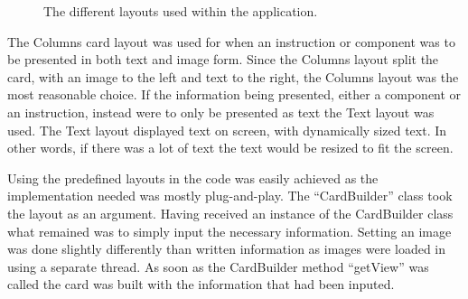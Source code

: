 	\begin{figure}[H]%
		\centering
   		 \qquad
    		\qquad
   		 \qquad
		\caption{The different layouts used within the application.}
		\label{imagesSimilarProducts}
	\end{figure}

The Columns card layout was used for when an instruction or component was to be presented in both text and image form. Since the Columns layout split the card, with an image to the left and text to the right, the Columns layout was the most reasonable choice. If the information being presented, either a component or an instruction, instead were to only be presented as text the Text layout was used. The Text layout displayed text on screen, with dynamically sized text. In other words, if there was a lot of text the text would be resized to fit the screen.

Using the predefined layouts in the code was easily achieved as the implementation needed was mostly plug-and-play. The ``CardBuilder'' class took the layout as an argument. Having received an instance of the CardBuilder class what remained was to simply input the necessary information. Setting an image was done slightly differently than written information as images were loaded in using a separate thread. As soon as the CardBuilder method ``getView'' was called the card was built with the information that had been inputed.

